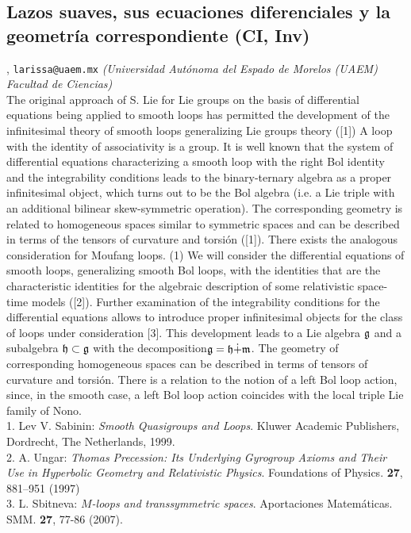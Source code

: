 \subsection{\sffamily Lazos suaves, sus ecuaciones diferenciales y la geometr\'ia  correspondiente {\footnotesize (CI, Inv)}} \label{reg-1391} 
, {\tt larissa@uaem.mx}  {\slshape (Universidad Aut\'onoma del Espado de Morelos (UAEM) Facultad de Ciencias)}\\
          \noindent The original approach of S. Lie for Lie groups on the basis of differential equations being applied to smooth loops has permitted the development of the infinitesimal theory of smooth loops generalizing Lie groups theory ([1]) A loop with the  identity of associativity is a group. It is well known that the system of differential equations characterizing a smooth loop with the right Bol identity and the integrability conditions leads to the binary-ternary algebra as a proper infinitesimal object, which turns out to be the Bol algebra (i.e. a Lie  triple with an additional bilinear skew-symmetric operation). The corresponding geometry is related to homogeneous spaces similar to symmetric spaces and can be described in terms of the  tensors of curvature and torsi\'on ([1]). There exists the analogous consideration for Moufang loops. (1) We will consider the differential equations of smooth loops, generalizing smooth Bol loops, with the identities that are the characteristic identities for the algebraic description of some relativistic space-time models ([2]). Further  examination  of the integrability conditions for the differential equations  allows  to introduce proper infinitesimal objects for the class of loops under consideration [3]. This development leads to a Lie algebra $\frak g$ and a subalgebra $\frak h\subset \frak g$ with the decomposition$\frak g=\frak h\dot+\frak m$. The geometry of corresponding homogeneous  spaces can be described in terms of tensors of curvature and torsi\'on. There is  a relation to the notion of a left Bol loop action, since,  in the smooth case, a left Bol loop action coincides with the local triple Lie family  of Nono.\\ 1. Lev V. Sabinin: {\em Smooth Quasigroups and Loops}.   Kluwer Academic Publishers, Dordrecht, The Netherlands, 1999.\\ 2.  A. Ungar: {\em Thomas Precession:  Its Underlying Gyrogroup Axioms and Their Use in Hyperbolic Geometry and Relativistic Physics}.  Foundations of Physics. {\bf 27}, 881--951 (1997)\\ 3. L. Sbitneva: {\em $M$-loops and transsymmetric spaces}.  Aportaciones Matem\'aticas. SMM. {\bf 27}, 77-86 (2007).
